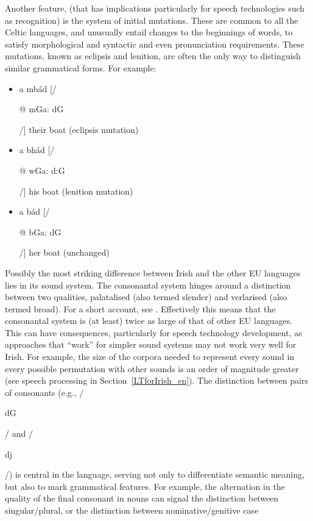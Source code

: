 \begin{multicols}{2}
Another feature, (that has implications particularly for speech technologies such as recognition) is the system of  initial mutations. These are common to all the Celtic languages, and unusually entail changes to the beginnings of words, to satisfy morphological and syntactic and even pronunciation requirements. These mutations, known as eclipsis and lenition, are often the only way to distinguish similar grammatical forms. For example:

\begin{itemize}
\item a mbád [/\begin{IPA}@ m\super Ga: d\super G\end{IPA}/] their boat (eclipsis mutation)
\item a bhád [/\begin{IPA}@ w\super Ga: d:G\end{IPA}/] his boat (lenition mutation)
\item a bád [/\begin{IPA}@ b\super Ga: d\super G\end{IPA}/] her boat (unchanged)
\end{itemize}


Possibly the most striking difference between Irish and the other EU languages lies in its sound system. The consonantal system hinges around a distinction between two qualities, palatalised (also termed slender) and verlarised (also termed broad). For a short account, see \cite{ipaguide}. Effectively this means that the consonantal system is (at least) twice as large of that of other EU languages.  This can have consequences, particularly for speech technology development, as approaches that ``work'' for simpler sound systems may not work very well for Irish. For example, the size of the corpora needed to represent every sound in every possible permutation with other sounds is an order of magnitude greater (see speech processing in Section~\ref{LTforIrish_en}). The distinction between pairs of consonants (e.g., /\begin{IPA}d\super G\end{IPA}/ and /\begin{IPA}d\super j\end{IPA}/) is central in the language, serving not only to differentiate semantic meaning, but also to mark grammatical features. For example, the alternation in the quality of the final consonant in nouns can signal the distinction between singular/plural, or the distinction between nominative/genitive case


\end{multicols}
